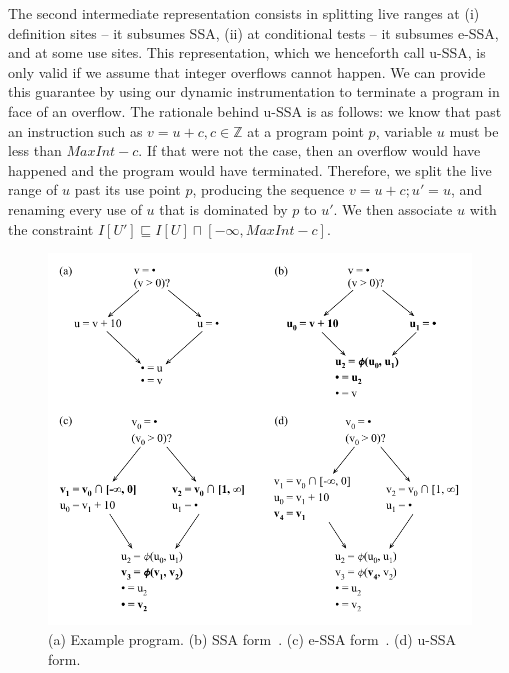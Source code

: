 \documentclass{sigplanconf}[10pt]
\begin{document}
The second intermediate representation consists in splitting live ranges at
(i) definition sites -- it subsumes SSA, (ii) at conditional tests -- it
subsumes e-SSA, and at some use sites.
This representation, which we henceforth call u-SSA, is only valid if we
assume that integer overflows cannot happen.
We can provide this guarantee by using our dynamic instrumentation to terminate
a program in face of an overflow.
The rationale behind u-SSA is as follows: we know that past an instruction such
as $v = u + c, c \in \mathbb{Z}$ at a program point $p$, variable $u$ must be
less than $\mathit{MaxInt} - c$.
If that were not the case, then an overflow would have happened and the
program would have terminated.
Therefore, we split the live range of $u$ past its use point $p$, producing the
sequence $v = u + c; u' = u$, and renaming every use of $u$ that is dominated
by $p$ to $u'$.
We then associate $u$ with the constraint $I[U'] \sqsubseteq I[U] \sqcap [-\infty, \mathit{MaxInt} - c]$.

\begin{figure}[t!]
\begin{center}
\includegraphics[width=\columnwidth]{images/ex_ir}
\end{center}
\caption{\label{fig:ex_ir}
(a) Example program.
(b) SSA form~\cite{Cytron91}.
(c) e-SSA form~\cite{Bodik00}.
(d) u-SSA form.}
\end{figure}
\end{document}
